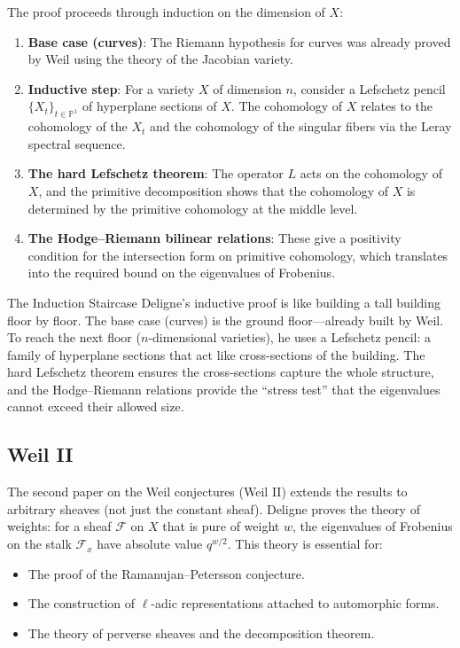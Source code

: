 The proof proceeds through induction on the dimension of $X$:
\begin{enumerate}
\item \textbf{Base case (curves)}: The Riemann hypothesis for curves was already proved by Weil using the theory of the Jacobian variety.
\item \textbf{Inductive step}: For a variety $X$ of dimension $n$, consider a Lefschetz pencil $\{X_t\}_{t \in \mathbb{P}^1}$ of hyperplane sections of $X$. The cohomology of $X$ relates to the cohomology of the $X_t$ and the cohomology of the singular fibers via the Leray spectral sequence.
\item \textbf{The hard Lefschetz theorem}: The operator $L$ acts on the cohomology of $X$, and the primitive decomposition shows that the cohomology of $X$ is determined by the primitive cohomology at the middle level.
\item \textbf{The Hodge--Riemann bilinear relations}: These give a positivity condition for the intersection form on primitive cohomology, which translates into the required bound on the eigenvalues of Frobenius.
\end{enumerate}

\begin{analogy}{The Induction Staircase}
Deligne's inductive proof is like building a tall building floor by floor. The base case (curves) is the ground floor---already built by Weil. To reach the next floor ($n$-dimensional varieties), he uses a Lefschetz pencil: a family of hyperplane sections that act like cross-sections of the building. The hard Lefschetz theorem ensures the cross-sections capture the whole structure, and the Hodge--Riemann relations provide the ``stress test'' that the eigenvalues cannot exceed their allowed size.
\end{analogy}

\subsection{Weil II}

The second paper on the Weil conjectures (Weil II) extends the results to arbitrary sheaves (not just the constant sheaf). Deligne proves the theory of weights: for a sheaf $\mathcal{F}$ on $X$ that is pure of weight $w$, the eigenvalues of Frobenius on the stalk $\mathcal{F}_x$ have absolute value $q^{w/2}$. This theory is essential for:
\begin{itemize}
\item The proof of the Ramanujan--Petersson conjecture.
\item The construction of $\ell$-adic representations attached to automorphic forms.
\item The theory of perverse sheaves and the decomposition theorem.
\end{itemize}

